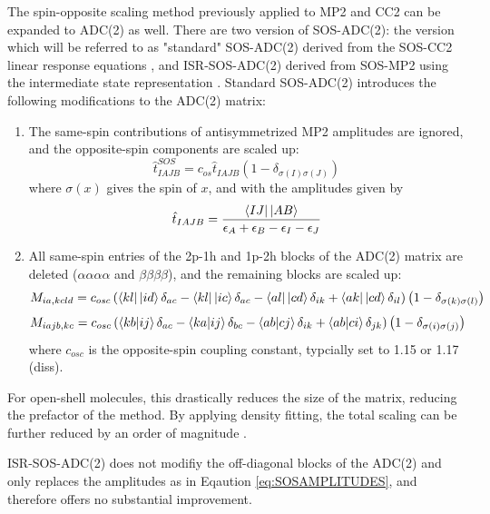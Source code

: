 The spin-opposite scaling method previously applied to MP2 and CC2 can be expanded to ADC(2) as well.    There are two version of SOS-ADC(2): the version which will be referred to as "standard" SOS-ADC(2) derived from the SOS-CC2 linear response equations \cite{Win2011}, and ISR-SOS-ADC(2) derived from SOS-MP2 using the intermediate state representation \cite{Kra2013}. Standard SOS-ADC(2) introduces the following modifications to the ADC(2) matrix:
\begin{enumerate}
\item The same-spin contributions of antisymmetrized MP2 amplitudes are ignored, and the opposite-spin components are scaled up:
\begin{equation}
\hat{t}_{IAJB}^{SOS} = c_{os} \hat{t}_{IAJB} \left( 1 - \delta _{\sigma (I) \sigma (J)} \right)
\label{eq:SOSAMPLITUDES}
\end{equation}
where $\sigma (x)$ gives the spin of $x$, and with the amplitudes given by
\begin{equation}
\hat{t}_{IAJB} = \frac{\bra{IJ}{}\ket{AB}}{\epsilon_A + \epsilon_B - \epsilon_I - \epsilon_J}
\end{equation}
\item All same-spin entries of the 2p-1h and 1p-2h blocks of the ADC(2) matrix are deleted ($\alpha\alpha\alpha\alpha$ and $\beta\beta\beta\beta$), and the  remaining blocks are scaled up:
\begin{equation}
M_{ia,kcld} = c_{osc} \left( \bra{kl}{}\ket{id} \delta_{ac} - \bra{kl}{}\ket{ic} \delta_{ac} - \bra{al}{}\ket{cd} \delta_{ik} + \bra{ak}{}\ket{cd} \delta_{il} \right) \left( 1 - \delta_{\sigma (k) \sigma (l)} \right)
\end{equation}
\begin{equation}
M_{iajb,kc} = c_{osc} \left( \bra{kb} \ket{ij} \delta_{ac} - \bra{ka} \ket{ij} \delta_{bc} - \bra{ab} \ket{cj} \delta_{ik} + \bra{ab} \ket{ci} \delta_{jk} \right) \left( 1 - \delta_{\sigma (i) \sigma (j)} \right)
\end{equation}
\noindent where $c_{osc}$ is the opposite-spin coupling constant, typcially set to 1.15 \cite{Kra2013} or 1.17 (diss).
\end{enumerate}

\noindent For open-shell molecules, this drastically reduces the size of the matrix, reducing the prefactor of the method. By applying density fitting, the total scaling can be further reduced by an order of magnitude \cite{Win2011}.

ISR-SOS-ADC(2) does not modifiy the off-diagonal blocks of the ADC(2) and only replaces the amplitudes as in Eqaution \ref{eq:SOSAMPLITUDES}, and therefore offers no substantial improvement. 

